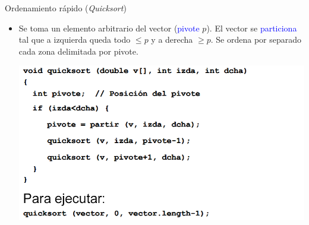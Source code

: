 \documentclass{beamer} %
\newcommand{\blue}[1]{\textcolor{blue}{#1}}
\begin{document}
\begin{frame}{Ordenamiento rápido ({\em Quicksort})}
    \begin{itemize}
        \item Se toma un elemento arbitrario del vector (\blue{pivote} $p$). El vector se \blue{particiona} tal que a izquierda queda todo $\leq p$ y a derecha $\geq p$. Se ordena por separado cada zona delimitada por pivote.
        \vspace{2ex}
        
        \begin{center}
            \includegraphics[width=.85\textwidth]{./image/cap5/quicksort1.png}
        \end{center}
    \end{itemize}
\end{frame}
\end{document}
